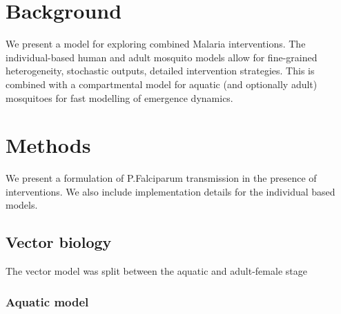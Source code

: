 \documentclass{bmcart}
\begin{document}


\section*{Background}
We present a model for exploring combined Malaria interventions. The individual-based human and adult mosquito models allow for fine-grained heterogeneity, stochastic outputs, detailed intervention strategies. This is combined with a compartmental model for aquatic (and optionally adult) mosquitoes for fast modelling of emergence dynamics.

\section*{Methods}

We present a formulation of P.Falciparum transmission in the presence of interventions. We also include implementation details for the individual based models.

\subsection*{Vector biology}

The vector model was split between the aquatic and adult-female stage

\subsubsection*{Aquatic model}
\end{document}
